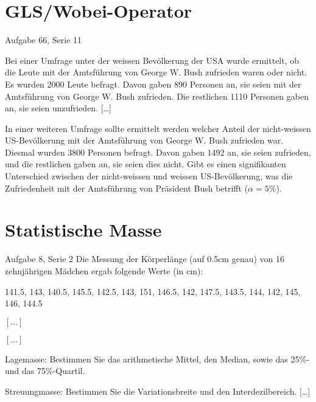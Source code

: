 \documentclass{beamer}
\begin{document}
\section{GLS/Wobei-Operator}
\begin{frame}{Aufgabe 66, Serie 11}
\begin{outline}
\item Bei einer Umfrage unter der weissen Bevölkerung der USA wurde ermittelt, ob
die Leute mit der Amtsführung von George W. Bush zufrieden waren oder nicht.
Es wurden 2000 Leute befragt. Davon gaben 890 Personen an, sie seien mit der
Amtsführung von George W. Bush zufrieden. Die restlichen 1110 Personen gaben an,
sie seien unzufrieden. [\dots]

\item In einer weiteren Umfrage sollte ermittelt werden welcher Anteil der nicht-weissen
US-Bevölkerung mit der Amtsführung von George W. Bush zufrieden war. Diesmal
wurden 3800 Personen befragt. Davon gaben 1492 an, sie seien zufrieden, und die
restlichen gaben an, sie seien dies nicht. Gibt es einen signifikanten Unterschied zwischen der nicht-weissen und weissen US-Bevölkerung, was die Zufriedenheit mit der
Amtsführung von Präsident Bush betrifft ($\alpha = 5\%$).
\end{outline}
\end{frame}

\section{Statistische Masse}
\begin{frame}{Aufgabe 8, Serie 2}
Die Messung der Körperlänge (auf 0.5cm genau) von 16 zehnjährigen Mädchen ergab
folgende Werte (in cm):

\begin{center}
141.5, 143, 140.5, 145.5, 142.5, 143, 151, 146.5, 142, 147.5, 143.5, 144, 142, 145, 146, 144.5
\end{center}
\begin{outline}
\item $[\dots]$
\item $[\dots]$
\item Lagemasse: Bestimmen Sie das arithmetische Mittel, den Median, sowie das 25\%-
und das 75\%-Quartil.
\item Streuungmasse: Bestimmen Sie die Variationsbreite und den Interdezilbereich. [\dots]
\end{outline}
\end{frame}
\end{document}
